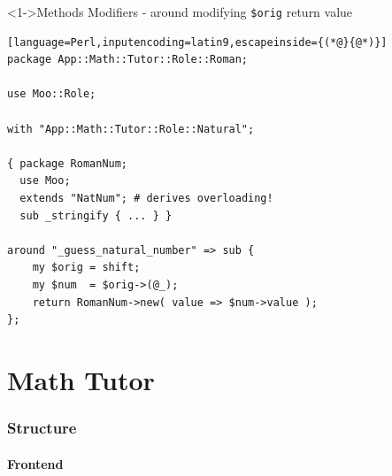 \documentclass[ngerman,xcolor={table,dvipsnames},smaller,compress,hyperref={bookmarks,colorlinks}]{beamer}
\begin{document}
\begin{frame}[t,fragile]

\begin{block}<1->{Methods Modifiers - around modifying \texttt{\$orig} return value}
\scriptsize
\begin{lstlisting}[language=Perl,inputencoding=latin9,escapeinside={(*@}{@*)}]
package App::Math::Tutor::Role::Roman;

use Moo::Role;

with "App::Math::Tutor::Role::Natural";

{ package RomanNum;
  use Moo;
  extends "NatNum"; # derives overloading!
  sub _stringify { ... } }

around "_guess_natural_number" => sub {
    my $orig = shift;
    my $num  = $orig->(@_);
    return RomanNum->new( value => $num->value );
};
\end{lstlisting}
\end{block}

\begin{itemize}
\end{itemize}

\end{frame}

\part{Math Tutor}

\section{Structure}

\subsection{Frontend}
\end{document}
